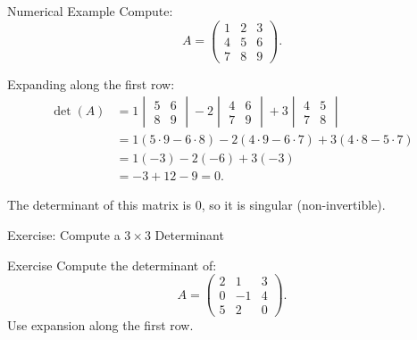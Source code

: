 \documentclass{beamer}
\begin{document}
\begin{frame}{Numerical Example}
Compute:
\begin{equation}
A =
\begin{pmatrix} 
1 & 2 & 3 \\ 
4 & 5 & 6 \\ 
7 & 8 & 9 
\end{pmatrix}.
\end{equation}

Expanding along the first row:
\begin{align}
\det(A) &=
1 
\begin{vmatrix} 
5 & 6 \\ 8 & 9 
\end{vmatrix}
- 2 
\begin{vmatrix} 
4 & 6 \\ 7 & 9 
\end{vmatrix}
+ 3 
\begin{vmatrix} 
4 & 5 \\ 7 & 8 
\end{vmatrix} \\
&= 1(5\cdot9 -6\cdot8) -2(4\cdot9 -6\cdot7) +3(4\cdot8 -5\cdot7) \\
&= 1(-3) -2(-6) +3(-3) \\
&= -3 +12 -9 = 0.
\end{align}

The determinant of this matrix is \(0\), so it is singular (non-invertible).
\end{frame}

\begin{frame}{Exercise: Compute a \(3 \times 3\) Determinant}
\begin{block}{Exercise}
Compute the determinant of:
\begin{equation}
A =
\begin{pmatrix} 
2 & 1 & 3 \\ 
0 & -1 & 4 \\ 
5 & 2 & 0 
\end{pmatrix}.
\end{equation}
Use expansion along the first row.
\end{block}
\end{frame}
\end{document}
